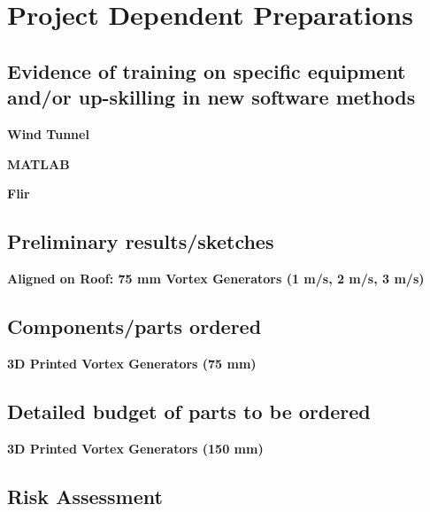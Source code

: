 \section{Project Dependent Preparations}

\subsection{Evidence of training on specific equipment and/or up-skilling in new software methods}
\noindent \textbf{Wind Tunnel}\par
\noindent \textbf{MATLAB}\par
\noindent \textbf{Flir}\par

\subsection{Preliminary results/sketches}
\noindent \textbf{Aligned on Roof: 75 mm Vortex Generators (1 m/s, 2 m/s, 3 m/s)}\par

\subsection{Components/parts ordered}
\noindent \textbf{3D Printed Vortex Generators (75 mm)}\par

\subsection{Detailed budget of parts to be ordered}\par
\noindent \textbf{3D Printed Vortex Generators (150 mm)}\par

\subsection{Risk Assessment}
\begin{table}[ht]
    \centering
    \caption{Risk Assessment Table}
    \label{tab:my_label}
\end{table}

